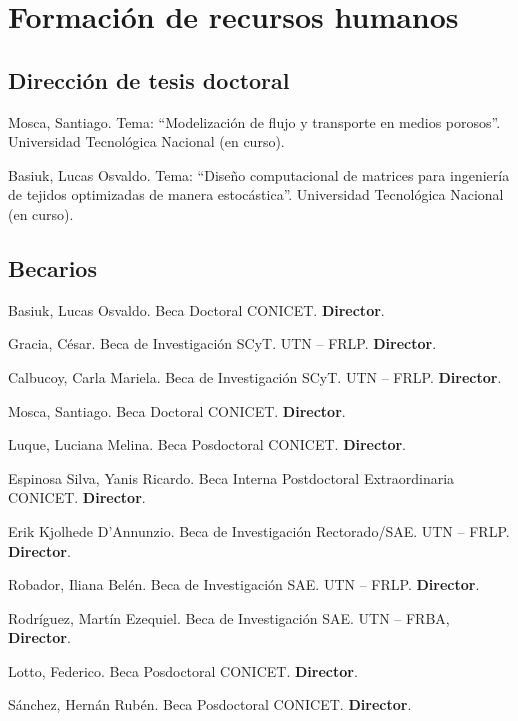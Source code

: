 \section{Formación de recursos humanos}

\subsection{Dirección de tesis doctoral}
 Mosca, Santiago. Tema: ``Modelización de flujo y transporte en medios porosos''. Universidad Tecnológica Nacional (en curso).

 Basiuk, Lucas Osvaldo. Tema: ``Diseño computacional de matrices para ingeniería de tejidos optimizadas de manera estocástica''. Universidad Tecnológica Nacional  (en curso).

\subsection{Becarios}

     Basiuk, Lucas Osvaldo. Beca Doctoral CONICET. \textbf{Director}.

     Gracia, César. Beca de Investigación SCyT. UTN -- FRLP. \textbf{Director}.

     Calbucoy, Carla Mariela. Beca de Investigación SCyT. UTN -- FRLP. \textbf{Director}.

     Mosca, Santiago. Beca Doctoral CONICET. \textbf{Director}.

     Luque, Luciana Melina. Beca Posdoctoral CONICET. \textbf{Director}.

     Espinosa Silva, Yanis Ricardo. Beca Interna Postdoctoral Extraordinaria CONICET. \textbf{Director}.

     Erik Kjolhede D'Annunzio. Beca de Investigación Rectorado/SAE. UTN -- FRLP. \textbf{Director}.

     Robador, Iliana Belén. Beca de Investigación SAE. UTN -- FRLP. \textbf{Director}.

     Rodríguez, Martín Ezequiel. Beca de Investigación SAE. UTN -- FRBA, \textbf{Director}.

     Lotto, Federico. Beca Posdoctoral CONICET. \textbf{Director}.

     Sánchez, Hernán Rubén. Beca Posdoctoral CONICET. \textbf{Director}.

